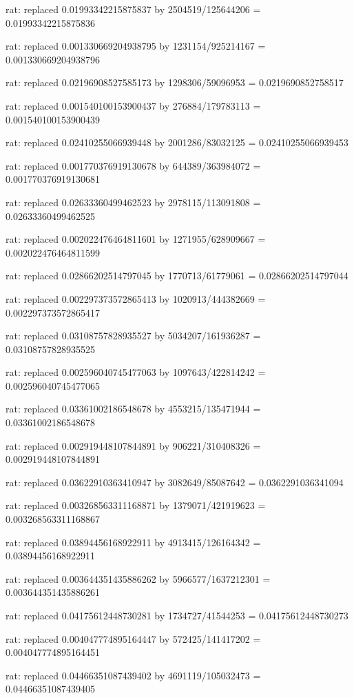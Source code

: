 \documentclass[a4paper,10pt]{article}
\begin{document}
\begin{eulernotebook}
\begin{eulercomment}
\begin{eulercomment}
\begin{eulercomment}
\begin{eulercomment}
\begin{eulercomment}
\begin{eulercomment}
\begin{eulercomment}
\begin{eulercomment}
\begin{eulercomment}
\begin{eulercomment}
\begin{eulercomment}
\begin{eulercomment}
\begin{eulercomment}
\begin{eulercomment}
\begin{eulercomment}
\begin{eulercomment}
\begin{euleroutput}
  rat: replaced 0.01993342215875837 by 2504519/125644206 = 0.01993342215875836
  
  rat: replaced 0.001330669204938795 by 1231154/925214167 = 0.001330669204938796
  
  rat: replaced 0.02196908527585173 by 1298306/59096953 = 0.0219690852758517
  
  rat: replaced 0.001540100153900437 by 276884/179783113 = 0.001540100153900439
  
  rat: replaced 0.02410255066939448 by 2001286/83032125 = 0.02410255066939453
  
  rat: replaced 0.001770376919130678 by 644389/363984072 = 0.001770376919130681
  
  rat: replaced 0.02633360499462523 by 2978115/113091808 = 0.02633360499462525
  
  rat: replaced 0.002022476464811601 by 1271955/628909667 = 0.002022476464811599
  
  rat: replaced 0.02866202514797045 by 1770713/61779061 = 0.02866202514797044
  
  rat: replaced 0.002297373572865413 by 1020913/444382669 = 0.002297373572865417
  
  rat: replaced 0.03108757828935527 by 5034207/161936287 = 0.03108757828935525
  
  rat: replaced 0.002596040745477063 by 1097643/422814242 = 0.002596040745477065
  
  rat: replaced 0.03361002186548678 by 4553215/135471944 = 0.03361002186548678
  
  rat: replaced 0.002919448107844891 by 906221/310408326 = 0.002919448107844891
  
  rat: replaced 0.03622910363410947 by 3082649/85087642 = 0.0362291036341094
  
  rat: replaced 0.003268563311168871 by 1379071/421919623 = 0.003268563311168867
  
  rat: replaced 0.03894456168922911 by 4913415/126164342 = 0.03894456168922911
  
  rat: replaced 0.003644351435886262 by 5966577/1637212301 = 0.003644351435886261
  
  rat: replaced 0.04175612448730281 by 1734727/41544253 = 0.04175612448730273
  
  rat: replaced 0.004047774895164447 by 572425/141417202 = 0.004047774895164451
  
  rat: replaced 0.04466351087439402 by 4691119/105032473 = 0.04466351087439405
  

\end{euleroutput}
\end{eulercomment}
\end{eulercomment}
\end{eulercomment}
\end{eulercomment}
\end{eulercomment}
\end{eulercomment}
\end{eulercomment}
\end{eulercomment}
\end{eulercomment}
\end{eulercomment}
\end{eulercomment}
\end{eulercomment}
\end{eulercomment}
\end{eulercomment}
\end{eulercomment}
\end{eulercomment}
\end{eulernotebook}
\end{document}
